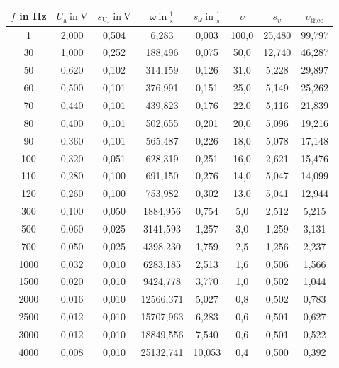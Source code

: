 \begin{table}[h]
    \centering
      \begin{tabular}{c||c|c|c|c|c|c|c}
      $f$ in Hz & $U_\text{a}\:\text{in}\:\text{V}$   & $s_{\text{U}_\text{a}}\:\text{in}\:\text{V}$ & $\omega\:\text{in}\:\frac{1}{\text{s}}$& $s_{\omega}\:\text{in}\:\frac{1}{\text{s}}$ & $\upsilon$ & $s_{\upsilon}$ & $\upsilon_\text{theo}$\\
      \hline
      1     & 2,000 & 0,504 & 6,283 & 0,003 & 100,0 & 25,480 & 99,797 \\
      30    & 1,000 & 0,252 & 188,496 & 0,075 & 50,0  & 12,740 & 46,287 \\
      50    & 0,620 & 0,102 & 314,159 & 0,126 & 31,0  & 5,228 & 29,897 \\
      60    & 0,500 & 0,101 & 376,991 & 0,151 & 25,0  & 5,149 & 25,262 \\
      70    & 0,440 & 0,101 & 439,823 & 0,176 & 22,0  & 5,116 & 21,839 \\
      80    & 0,400 & 0,101 & 502,655 & 0,201 & 20,0  & 5,096 & 19,216 \\
      90    & 0,360 & 0,101 & 565,487 & 0,226 & 18,0  & 5,078 & 17,148 \\
      100   & 0,320 & 0,051 & 628,319 & 0,251 & 16,0  & 2,621 & 15,476 \\
      110   & 0,280 & 0,100 & 691,150 & 0,276 & 14,0  & 5,047 & 14,099 \\
      120   & 0,260 & 0,100 & 753,982 & 0,302 & 13,0  & 5,041 & 12,944 \\
      300   & 0,100 & 0,050 & 1884,956 & 0,754 & 5,0   & 2,512 & 5,215 \\
      500   & 0,060 & 0,025 & 3141,593 & 1,257 & 3,0   & 1,259 & 3,131 \\
      700   & 0,050 & 0,025 & 4398,230 & 1,759 & 2,5   & 1,256 & 2,237 \\
      1000  & 0,032 & 0,010 & 6283,185 & 2,513 & 1,6   & 0,506 & 1,566 \\
      1500  & 0,020 & 0,010 & 9424,778 & 3,770 & 1,0   & 0,502 & 1,044 \\
      2000  & 0,016 & 0,010 & 12566,371 & 5,027 & 0,8   & 0,502 & 0,783 \\
      2500  & 0,012 & 0,010 & 15707,963 & 6,283 & 0,6   & 0,501 & 0,627 \\
      3000  & 0,012 & 0,010 & 18849,556 & 7,540 & 0,6   & 0,501 & 0,522 \\
      4000  & 0,008 & 0,010 & 25132,741 & 10,053 & 0,4   & 0,500 & 0,392 \\

\end{tabular}
\end{table}
